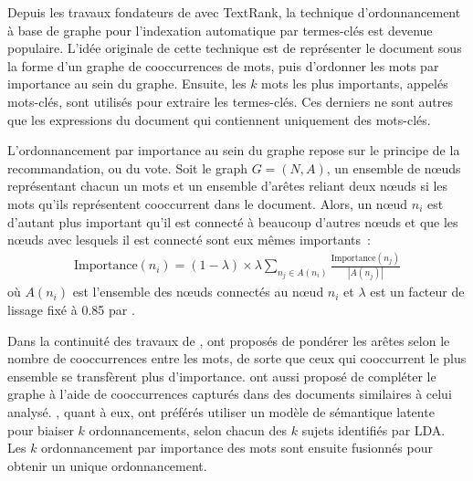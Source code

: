     Depuis les travaux fondateurs de  avec
    TextRank, la technique d'ordonnancement à base de graphe pour l'indexation
    automatique par termes-clés est devenue populaire. L'idée originale de cette
    technique est de représenter le document sous la forme d'un graphe de
    cooccurrences de mots, puis d'ordonner les mots par importance au sein du
    graphe. Ensuite, les $k$ mots les plus importants, appelés mots-clés, sont
    utilisés pour extraire les termes-clés. Ces derniers ne sont autres que les
    expressions du document qui contiennent uniquement des mots-clés.

    L'ordonnancement par importance au sein du graphe repose sur le principe de
    la recommandation, ou du vote. Soit le graph $G = (N, A)$, un ensemble de
    n\oe{}uds représentant chacun un mots et un ensemble d'arêtes reliant deux
    n\oe{}uds si les mots qu'ils représentent cooccurrent dans le document.
    Alors, un n\oe{}ud $n_i$ est d'autant plus important qu'il est connecté à
    beaucoup d'autres n\oe{}uds et que les n\oe{}uds avec lesquels il est
    connecté sont eux mêmes importants~:
    \begin{align}
      \text{Importance}(n_i) = (1 - \lambda) \times \lambda \sum_{n_j \in A(n_i)}\frac{\text{Importance}(n_j)}{|A(n_j)|}
    \end{align}
    où $A(n_i)$ est l'ensemble des n\oe{}uds connectés au n\oe{}ud $n_i$ et
    $\lambda$ est un facteur de lissage fixé à 0.85 par
    .

    Dans la continuité des travaux de ,
     ont proposés de pondérer les arêtes selon le
    nombre de cooccurrences entre les mots, de sorte que ceux qui
    cooccurrent le plus ensemble se transfèrent plus d'importance.
     ont aussi proposé de compléter le graphe à
    l'aide de cooccurrences capturés dans des documents similaires à celui
    analysé. , quant à eux, ont préférés utiliser un
    modèle de sémantique latente~\cite[LDA]{blei2003lda} pour biaiser $k$
    ordonnancements, selon chacun des $k$ sujets identifiés par LDA. Les $k$
    ordonnancement par importance des mots sont ensuite fusionnés pour obtenir
    un unique ordonnancement.


